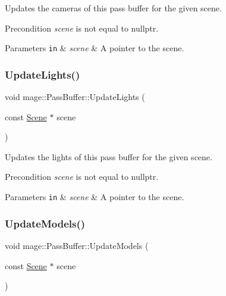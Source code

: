 Updates the cameras of this pass buffer for the given scene.

\begin{DoxyPrecond}{Precondition}
{\itshape scene} is not equal to {\ttfamily nullptr}. 
\end{DoxyPrecond}

\begin{DoxyParams}[1]{Parameters}
\mbox{\tt in}  & {\em scene} & A pointer to the scene. \\
\hline
\end{DoxyParams}
\hypertarget{structmage_1_1_pass_buffer_a91a779121ecb4c08605d3073c34674c9}{}\label{structmage_1_1_pass_buffer_a91a779121ecb4c08605d3073c34674c9} 
\subsubsection{\texorpdfstring{Update\+Lights()}{UpdateLights()}}
{\footnotesize\ttfamily void mage\+::\+Pass\+Buffer\+::\+Update\+Lights (\begin{DoxyParamCaption}\item[{const \hyperlink{classmage_1_1_scene}{Scene} $\ast$}]{scene }\end{DoxyParamCaption})\hspace{0.3cm}{\ttfamily [private]}}

Updates the lights of this pass buffer for the given scene.

\begin{DoxyPrecond}{Precondition}
{\itshape scene} is not equal to {\ttfamily nullptr}. 
\end{DoxyPrecond}

\begin{DoxyParams}[1]{Parameters}
\mbox{\tt in}  & {\em scene} & A pointer to the scene. \\
\hline
\end{DoxyParams}
\hypertarget{structmage_1_1_pass_buffer_a02d68f950566e8283d3fc74bdf19b66a}{}\label{structmage_1_1_pass_buffer_a02d68f950566e8283d3fc74bdf19b66a} 
\subsubsection{\texorpdfstring{Update\+Models()}{UpdateModels()}}
{\footnotesize\ttfamily void mage\+::\+Pass\+Buffer\+::\+Update\+Models (\begin{DoxyParamCaption}\item[{const \hyperlink{classmage_1_1_scene}{Scene} $\ast$}]{scene }\end{DoxyParamCaption})\hspace{0.3cm}{\ttfamily [private]}}


